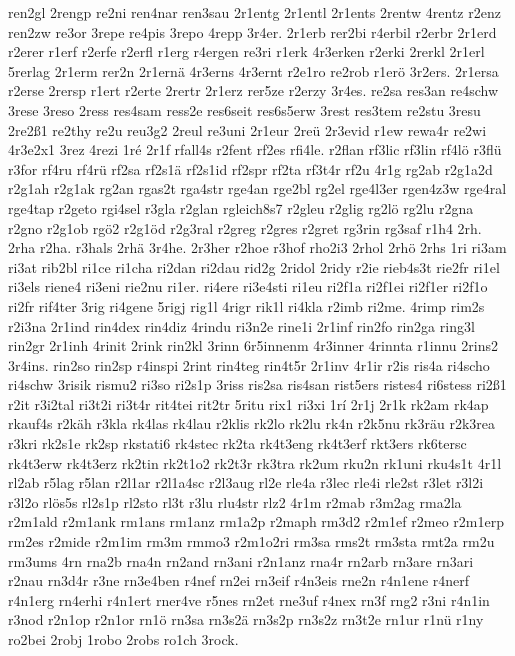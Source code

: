 {ren2gl
2rengp
re2ni
ren4nar
ren3sau
2r1entg
2r1entl
2r1ents
2rentw
4rentz
r2enz
ren2zw
re3or
3repe
re4pis
3repo
4repp
3r4er.
2r1erb
rer2bi
r4erbil
r2erbr
2r1erd
r2erer
r1erf
r2erfe
r2erfl
r1erg
r4ergen
re3ri
r1erk
4r3erken
r2erki
2rerkl
2r1erl
5rerlag
2r1erm
rer2n
2r1ernä
4r3erns
4r3ernt
r2e1ro
re2rob
r1erö
3r2ers.
2r1ersa
r2erse
2rersp
r1ert
r2erte
2rertr
2r1erz
rer5ze
r2erzy
3r4es.
re2sa
res3an
re4schw
3rese
3reso
2ress
res4sam
ress2e
res6seit
res6s5erw
3rest
res3tem
re2stu
3resu
2re2ß1
re2thy
re2u
reu3g2
2reul
re3uni
2r1eur
2reü
2r3evid
r1ew
rewa4r
re2wi
4r3e2x1
3rez
4rezi
1ré
2r1f
rfall4s
r2fent
rf2es
rfi4le.
r2flan
rf3lic
rf3lin
rf4lö
r3flü
r3for
rf4ru
rf4rü
rf2sa
rf2s1ä
rf2s1id
rf2spr
rf2ta
rf3t4r
rf2u
4r1g
rg2ab
r2g1a2d
r2g1ah
r2g1ak
rg2an
rgas2t
rga4str
rge4an
rge2bl
rg2el
rge4l3er
rgen4z3w
rge4ral
rge4tap
r2geto
rgi4sel
r3gla
r2glan
rgleich8s7
r2gleu
r2glig
rg2lö
rg2lu
r2gna
r2gno
r2g1ob
rgö2
r2g1öd
r2g3ral
r2greg
r2gres
r2gret
rg3rin
rg3saf
r1h4
2rh.
2rha
r2ha.
r3hals
2rhä
3r4he.
2r3her
r2hoe
r3hof
rho2i3
2rhol
2rhö
2rhs
1ri
ri3am
ri3at
rib2bl
ri1ce
ri1cha
ri2dan
ri2dau
rid2g
2ridol
2ridy
r2ie
rieb4s3t
rie2fr
ri1el
ri3els
riene4
ri3eni
rie2nu
ri1er.
ri4ere
ri3e4sti
ri1eu
ri2f1a
ri2f1ei
ri2f1er
ri2f1o
ri2fr
rif4ter
3rig
ri4gene
5rigj
rig1l
4rigr
rik1l
ri4kla
r2imb
ri2me.
4rimp
rim2s
r2i3na
2r1ind
rin4dex
rin4diz
4rindu
ri3n2e
rine1i
2r1inf
rin2fo
rin2ga
ring3l
rin2gr
2r1inh
4rinit
2rink
rin2kl
3rinn
6r5innenm
4r3inner
4rinnta
r1innu
2rins2
3r4ins.
rin2so
rin2sp
r4inspi
2rint
rin4teg
rin4t5r
2r1inv
4r1ir
r2is
ris4a
ri4scho
ri4schw
3risik
rismu2
ri3so
ri2s1p
3riss
ris2sa
ris4san
rist5ers
ristes4
ri6stess
ri2ß1
r2it
r3i2tal
ri3t2i
ri3t4r
rit4tei
rit2tr
5ritu
rix1
ri3xi
1rí
2r1j
2r1k
rk2am
rk4ap
rkauf4s
r2käh
r3kla
rk4las
rk4lau
r2klis
rk2lo
rk2lu
rk4n
r2k5nu
rk3räu
r2k3rea
r3kri
rk2s1e
rk2sp
rkstati6
rk4stec
rk2ta
rk4t3eng
rk4t3erf
rkt3ers
rk6tersc
rk4t3erw
rk4t3erz
rk2tin
rk2t1o2
rk2t3r
rk3tra
rk2um
rku2n
rk1uni
rku4s1t
4r1l
rl2ab
r5lag
r5lan
r2l1ar
r2l1a4sc
r2l3aug
rl2e
rle4a
r3lec
rle4i
rle2st
r3let
r3l2i
r3l2o
rlös5s
rl2s1p
rl2sto
rl3t
r3lu
rlu4str
rlz2
4r1m
r2mab
r3m2ag
rma2la
r2m1ald
r2m1ank
rm1ans
rm1anz
rm1a2p
r2maph
rm3d2
r2m1ef
r2meo
r2m1erp
rm2es
r2mide
r2m1im
rm3m
rmmo3
r2m1o2ri
rm3sa
rms2t
rm3sta
rmt2a
rm2u
rm3ums
4rn
rna2b
rna4n
rn2and
rn3ani
r2n1anz
rna4r
rn2arb
rn3are
rn3ari
r2nau
rn3d4r
r3ne
rn3e4ben
r4nef
rn2ei
rn3eif
r4n3eis
rne2n
r4n1ene
r4nerf
r4n1erg
rn4erhi
r4n1ert
rner4ve
r5nes
rn2et
rne3uf
r4nex
rn3f
rng2
r3ni
r4n1in
r3nod
r2n1op
r2n1or
rn1ö
rn3sa
rn3s2ä
rn3s2p
rn3s2z
rn3t2e
rn1ur
r1nü
r1ny
ro2bei
2robj
1robo
2robs
ro1ch
3rock.
}
